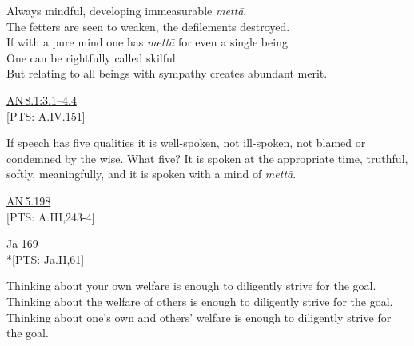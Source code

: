 \documentclass[10pt, openright]{book}
\begin{document}
\begin{itemize}


Always mindful, developing immeasurable \textit{mettā}. \\ 
The fetters are seen to weaken, the defilements destroyed. \\ 
If with a pure mind one has \textit{mettā} for even a single being \\ 
One can be rightfully called skilful. \\ 
But relating to all beings with sympathy creates abundant merit.


\end{itemize}
\begin{flushright}
\href{https://suttacentral.net/an8.1/en/sujato\#3.1}{AN 8.1:3.1–4.4}\\

[PTS: A.IV.151]


\end{flushright}
If speech has five qualities it is well-spoken, not ill-spoken, not blamed or condemned by the wise. What five? It is spoken at the appropriate time, truthful, softly, meaningfully, and it is spoken with a mind of \textit{mettā}.


\begin{flushright}
\href{https://suttacentral.net/an5.198/en/sujato}{AN 5.198}\\

[PTS: A.III,243-4]


\end{flushright}


\begin{flushright}
\href{https://suttacentral.net/ja169/en/rouse}{Ja 169}\\

*[PTS: Ja.II,61]


\end{flushright}
Thinking about your own welfare is enough to diligently strive for the goal. Thinking about the welfare of others is enough to diligently strive for the goal. Thinking about one’s own and others’ welfare is enough to diligently strive for the goal.
\end{document}
